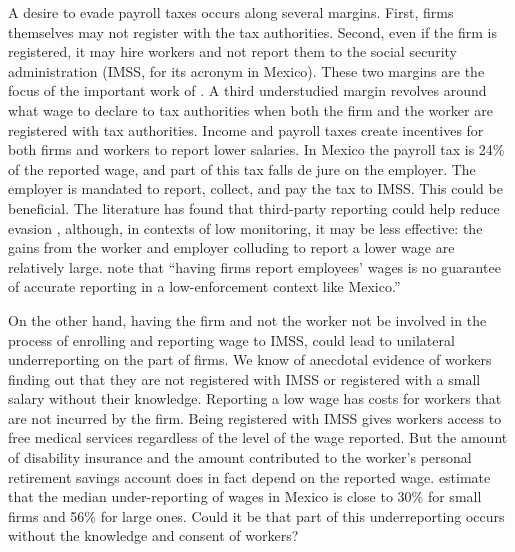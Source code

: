 \documentclass[oneside,11pt]{article}
\begin{document}
A desire to evade payroll taxes occurs along several margins. First, firms themselves may not register with the tax authorities. Second, even if the firm is registered, it may hire workers and not report them to the social security administration (IMSS, for its acronym in Mexico).%
These two margins are the focus of the important work of \cite{Ulyssea}. A third understudied margin revolves around what wage to declare to tax authorities when both the firm and the worker are registered with tax authorities. Income and payroll taxes create incentives for both firms and workers to report lower salaries. In Mexico the payroll tax is 24\% of the reported wage, and part of this tax falls de jure on the employer. The employer is mandated to report, collect, and pay the tax to IMSS. This could be beneficial. The literature has found that third-party reporting could help reduce evasion \citep{Denmark}, although, in contexts of low monitoring, it may be less effective: the gains from the worker and employer colluding to report a lower wage are relatively large. \cite{kumler2020enlisting} note that ``having firms report employees’ wages is no guarantee of accurate reporting in a low-enforcement context like Mexico.'' %

On the other hand, having the firm and not the worker not be involved in the process of enrolling and reporting wage to IMSS, could lead to unilateral underreporting on the part of firms. We know of anecdotal evidence of workers finding out that they are not registered with IMSS or registered with a small salary without their knowledge. Reporting a low wage has costs for workers that are not incurred by the firm. Being registered with IMSS gives workers access to free medical services regardless of the level of the wage reported. But the amount of disability insurance and the amount contributed to the worker's personal retirement savings account does in fact depend on the reported wage. \cite{kumler2020enlisting} estimate that the median under-reporting of wages in Mexico is close to 30\% for small firms and 56\% for large ones. Could it be that part of this underreporting occurs without the knowledge and consent of workers? 
\end{document}
